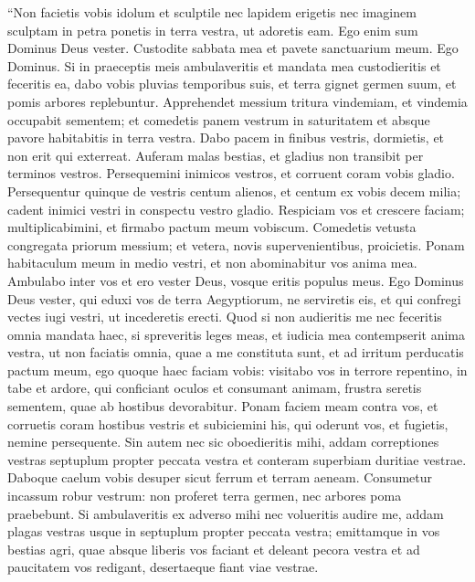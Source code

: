 \begin{biblechapter}  
\verse “Non facietis vobis idolum et sculptile nec lapidem erigetis nec imaginem sculptam in petra ponetis in terra vestra, ut adoretis eam. Ego enim sum Dominus Deus vester. 
\verse Custodite sabbata mea et pavete sanctuarium meum. Ego Dominus. 
\verse Si in praeceptis meis ambulaveritis et mandata mea custodieritis et feceritis ea, 
\verse dabo vobis pluvias temporibus suis, et terra gignet germen suum, et pomis arbores replebuntur. 
\verse Apprehendet messium tritura vindemiam, et vindemia occupabit sementem; et comedetis panem vestrum in saturitatem et absque pavore habitabitis in terra vestra. 
\verse Dabo pacem in finibus vestris, dormietis, et non erit qui exterreat. Auferam malas bestias, et gladius non transibit per terminos vestros. 
\verse Persequemini inimicos vestros, et corruent coram vobis gladio. 
\verse Persequentur quinque de vestris centum alienos, et centum ex vobis decem milia; cadent inimici vestri in conspectu vestro gladio. 
\verse Respiciam vos et crescere faciam; multiplicabimini, et firmabo pactum meum vobiscum. 
\verse Comedetis vetusta congregata priorum messium; et vetera, novis supervenientibus, proicietis. 
\verse Ponam habitaculum meum in medio vestri, et non abominabitur vos anima mea.  
\verse Ambulabo inter vos et ero vester Deus, vosque eritis populus meus. 
\verse Ego Dominus Deus vester, qui eduxi vos de terra Aegyptiorum, ne serviretis eis, et qui confregi vectes iugi vestri, ut incederetis erecti. 
\verse Quod si non audieritis me nec feceritis omnia mandata haec, 
\verse si spreveritis leges meas, et iudicia mea contempserit anima vestra, ut non faciatis omnia, quae a me constituta sunt, et ad irritum perducatis pactum meum,  
\verse ego quoque haec faciam vobis: visitabo vos in terrore repentino, in tabe et ardore, qui conficiant oculos et consumant animam, frustra seretis sementem, quae ab hostibus devorabitur. 
\verse Ponam faciem meam contra vos, et corruetis coram hostibus vestris et subiciemini his, qui oderunt vos, et fugietis, nemine persequente. 
\verse Sin autem nec sic oboedieritis mihi, addam correptiones vestras septuplum propter peccata vestra 
\verse et conteram superbiam duritiae vestrae. Daboque caelum vobis desuper sicut ferrum et terram aeneam. 
\verse Consumetur incassum robur vestrum: non proferet terra germen, nec arbores poma praebebunt. 
\verse Si ambulaveritis ex adverso mihi nec volueritis audire me, addam plagas vestras usque in septuplum propter peccata vestra; 
\verse emittamque in vos bestias agri, quae absque liberis vos faciant et deleant pecora vestra et ad paucitatem vos redigant, desertaeque fiant viae vestrae. 

\end{biblechapter}
